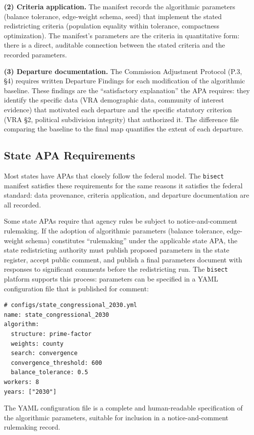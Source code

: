 \textbf{(2) Criteria application.} The manifest records the algorithmic parameters (balance tolerance, edge-weight schema, seed) that implement the stated redistricting criteria (population equality within tolerance, compactness optimization). The manifest's parameters are the criteria in quantitative form: there is a direct, auditable connection between the stated criteria and the recorded parameters.

\textbf{(3) Departure documentation.} The Commission Adjustment Protocol (P.3, \S4) requires written Departure Findings for each modification of the algorithmic baseline. These findings are the ``satisfactory explanation'' the APA requires: they identify the specific data (VRA demographic data, community of interest evidence) that motivated each departure and the specific statutory criterion (VRA \S2, political subdivision integrity) that authorized it. The difference file comparing the baseline to the final map quantifies the extent of each departure.

\subsection{State APA Requirements}

Most states have APAs that closely follow the federal model. The \texttt{bisect} manifest satisfies these requirements for the same reasons it satisfies the federal standard: data provenance, criteria application, and departure documentation are all recorded.

Some state APAs require that agency rules be subject to notice-and-comment rulemaking. If the adoption of algorithmic parameters (balance tolerance, edge-weight schema) constitutes ``rulemaking'' under the applicable state APA, the state redistricting authority must publish proposed parameters in the state register, accept public comment, and publish a final parameters document with responses to significant comments before the redistricting run. The \texttt{bisect} platform supports this process: parameters can be specified in a YAML configuration file that is published for comment:

\begin{verbatim}
# configs/state_congressional_2030.yml
name: state_congressional_2030
algorithm:
  structure: prime-factor
  weights: county
  search: convergence
  convergence_threshold: 600
  balance_tolerance: 0.5
workers: 8
years: ["2030"]
\end{verbatim}

The YAML configuration file is a complete and human-readable specification of the algorithmic parameters, suitable for inclusion in a notice-and-comment rulemaking record.

